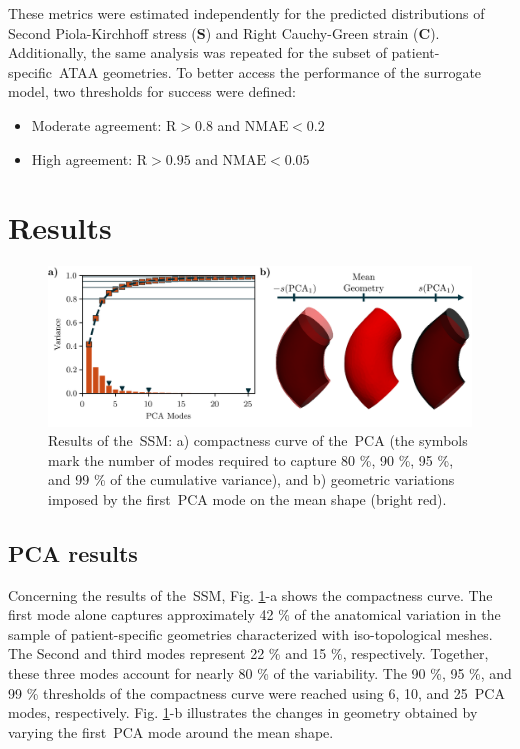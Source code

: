 \documentclass[a4paper,fleqn]{cas-sc}
\begin{document}
    These metrics were estimated independently for the predicted distributions of Second Piola-Kirchhoff stress ($\boldsymbol{S}$) and Right Cauchy-Green strain ($\boldsymbol{C}$). Additionally, the same analysis was repeated for the subset of patient-specific~\gls{ATAA} geometries. To better access the performance of the surrogate model, two thresholds for success were defined:
    \begin{itemize}
        \item Moderate agreement: $\mathrm{R} > 0.8$ and $\mathrm{NMAE} < 0.2$
        \item High agreement: $\mathrm{R} > 0.95$ and $\mathrm{NMAE} < 0.05$
    \end{itemize}

\section{Results} \label{sec:results}

\begin{figure}[h]
  \centering
  \includegraphics[width=\textwidth]{fig2}
  \caption{Results of the~\gls{SSM}: a) compactness curve of the~\gls{PCA} (the symbols mark the number of modes required to capture 80 \%, 90 \%, 95 \%, and 99 \% of the cumulative variance), and b) geometric variations imposed by the first~\gls{PCA} mode on the mean shape (bright red).}
  \label{fig:pcaRes}
\end{figure}

\subsection{PCA results}
  Concerning the results of the~\gls{SSM}, Fig. \ref{fig:pcaRes}-a shows the compactness curve. The first mode alone captures approximately 42 \% of the anatomical variation in the sample of patient-specific geometries characterized with iso-topological meshes. The Second and third modes represent 22 \% and 15 \%, respectively. Together, these three modes account for nearly 80 \% of the variability. The 90 \%, 95 \%, and 99 \% thresholds of the compactness curve were reached using 6, 10, and 25~\gls{PCA} modes, respectively. Fig. \ref{fig:pcaRes}-b illustrates the changes in geometry obtained by varying the first~\gls{PCA} mode around the mean shape.
\end{document}
